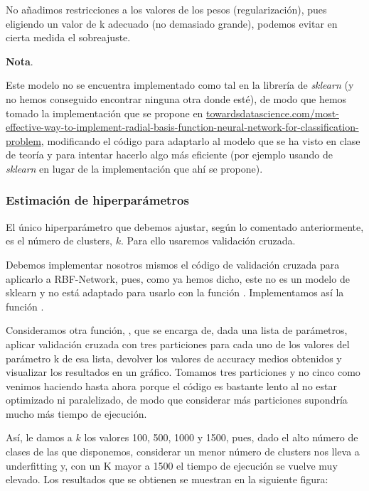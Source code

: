 \documentclass[a4]{article}
\begin{document}
No añadimos restricciones a los valores de los pesos (regularización), pues eligiendo un valor de k adecuado (no demasiado grande), podemos evitar en cierta medida el sobreajuste. 

\textbf{Nota}.

Este modelo no se encuentra implementado como tal en la librería de \textit{sklearn} (y no hemos conseguido encontrar ninguna otra donde esté), de modo que hemos tomado la implementación que se propone en \href{https://towardsdatascience.com/most-effective-way-to-implement-radial-basis-function-neural-network-for-classification-problem-33c467803319}{towardsdatascience.com/most-effective-way-to-implement-radial-basis-function-neural-network-for-classification-problem}, modificando el código para adaptarlo al modelo que se ha visto en clase de teoría y para intentar hacerlo algo más eficiente (por ejemplo usando  de \textit{sklearn} en lugar de la implementación que ahí se propone).

\subsubsection{Estimación de hiperparámetros}

El único hiperparámetro que debemos ajustar, según lo comentado anteriormente, es el número de clusters, $k$. Para ello usaremos validación cruzada. 

Debemos implementar nosotros mismos el código de validación cruzada para aplicarlo a RBF-Network, pues, como ya hemos dicho, este no es un modelo de sklearn y no está adaptado para usarlo con la función . Implementamos así la función .

Consideramos otra función, , que se encarga de, dada una lista de parámetros, aplicar validación cruzada con tres particiones para cada uno de los valores del parámetro k de esa lista, devolver los valores de accuracy medios obtenidos y visualizar los resultados en un gráfico. Tomamos tres particiones y no cinco como venimos haciendo hasta ahora porque el código es bastante lento al no estar optimizado ni paralelizado, de modo que considerar más particiones supondría mucho más tiempo de ejecución.

Así, le damos a $k$ los valores 100, 500, 1000 y 1500, pues, dado el alto número de clases de las que disponemos, considerar un menor número de clusters nos lleva a underfitting y, con un K mayor a 1500 el tiempo de ejecución se vuelve muy elevado. Los resultados que se obtienen se muestran en la siguiente figura: 
\end{document}
